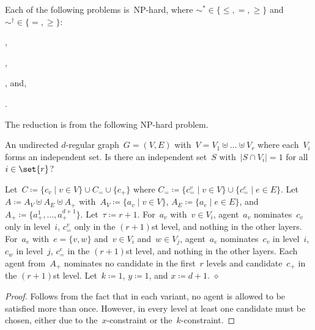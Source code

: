 \documentclass[10pt,a4paper,twocolumn]{article}
\theoremstyle{plain}
\theoremstyle{definition}
\theoremstyle{remark}
\newcommand{\cqed}{\hfill$\diamond$}
\newcommand{\cocl}[1]{\textrm{#1}}
\newcommand{\NP}{\cocl{NP}}
\newcommand{\ceq}{\coloneqq}
\begin{document}
{{  \begin{proposition}\label{prop:rmis}
    Each of the following problems
  is~\NP-hard,
  where $\sim^* \in\{\leq,=,\geq\}$
  and $\sim^\dagger \in\{=,\geq\}$:
  \begin{inparaenum}[(i)]
    \item \bicmce[$\sim^*$][$\geq$][$\leq$]{\ourOWA,\ourPREF},
    \item \bicmce[$\sim^*$][$=$][$\leq$]{\ourOWA,\ourPREF},
    \item \bicmce[$\sim^\dagger$][$\leq$][$\leq$]{\ourOWA,\ourPREF}, \label{prop:rmis:dagger}
    and, 
    \item \bicmce[$\geq$][$\geq$][$=$]{\ourOWA,\ourPREF}.
  \end{inparaenum} 
  \end{proposition}

  The reduction is from the following \NP-hard problem.

  {An undirected $d$-regular graph~$G=(V,E)$ with~$V=V_1\uplus\dots\uplus V_r$ where each~$V_i$ forms an independent set.}
  {Is there an independent set~$S$ with~$|S\cap V_i|=1$ for all~$i\in\set{r}$?}

  \begin{construction}
  \label{constr:rmis}
  Let~$C\ceq \{c_v\mid v\in V\}\cup C_= \cup\{c_+\}$ where
  $C_= \ceq \{c_=^v\mid v\in V\}\cup \{c_=^e\mid e\in E\}$. 
  Let~$A\ceq A_V\uplus A_E\uplus A_+$ 
  with~$A_V\ceq\{a_v\mid v\in V\}$,
  $A_E\ceq\{a_e\mid e\in E\}$, and
  $A_+\ceq \{a_+^1,\dots,a_+^{d+1}\}$.
  Let~$\tau\ceq r+1$.
  For~$a_v$ with~$v\in V_i$,
  agent~$a_v$ nominates~$c_v$ only in level~$i$,
  $c_=^v$ only in the $(r+1)$st level,
  and nothing in the other layers.
  For~$a_e$ with~$e=\{v,w\}$ and~$v\in V_i$ and~$w\in V_j$,
  agent~$a_e$ nominates~$c_v$ in level~$i$,
  $c_w$ in level~$j$,
  $c_=^e$ in the $(r+1)$st level,
  and nothing in the other layers.
  Each agent from~$A_+$ nominates no candidate in the first~$r$ levels and candidate~$c_+$ in the $(r+1)$st level.
  Let~$k\ceq1$,
  $y\ceq 1$,
  and 
  $x\ceq d+1$.
%
  \cqed
  \end{construction}

  \begin{proof}
  Follows from the fact that in each variant,
  no agent is allowed to be satisfied more than once.
  However,
  in every level at least one candidate must be chosen,
  either due to the~$x$-constraint or the~$k$-constraint.
  \end{proof}
  
}}
\end{document}
